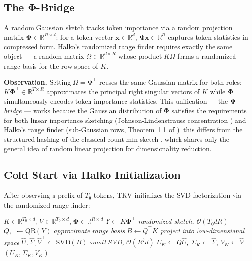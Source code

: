 \documentclass{article}
\newcommand{\R}{\mathbb{R}}
\let\PhiSymbol\Phi
\renewcommand{\Phi}{\boldsymbol{\PhiSymbol}}
\begin{document}
\subsection{The \texorpdfstring{$\Phi$}{Phi}-Bridge}
\label{sec:phi}

A random Gaussian sketch tracks token importance via a random projection
matrix $\Phi \in \R^{R \times d}$: for a token vector $\mathbf{x} \in \R^d$,
$\Phi \mathbf{x} \in \R^R$ captures token statistics in compressed form.
Halko's randomized range finder requires exactly the same object --- a
random matrix $\Omega \in \R^{d \times R}$ whose product $K\Omega$ forms a
randomized range basis for the row space of $K$.

\textbf{Observation.}  Setting $\Omega = \Phi^\top$ reuses the same
Gaussian matrix for both roles: $K\Phi^\top \in \R^{T \times R}$
approximates the principal right singular vectors of $K$ while $\Phi$
simultaneously encodes token importance statistics.  This unification ---
the \emph{$\Phi$-bridge} --- works because the Gaussian distribution of
$\Phi$ satisfies the requirements for both linear importance sketching
(Johnson-Lindenstrauss concentration \citep{johnson1984}) and Halko's range finder
(sub-Gaussian rows, Theorem~1.1 of \citep{halko2011}); this differs from
the structured hashing of the classical count-min sketch
\citep{cormode2005}, which shares only the general idea of random linear
projection for dimensionality reduction.

\subsection{Cold Start via Halko Initialization}
\label{sec:coldstart}

After observing a prefix of $T_0$ tokens, TKV initializes the SVD factorization
via the randomized range finder:

\begin{algorithm}[H]
\caption{Halko Cold Start with $\Phi$-Bridge}
\begin{algorithmic}[1]
\Require $K \in \R^{T_0 \times d}$, $V \in \R^{T_0 \times d}$, $\Phi \in \R^{R \times d}$
\State $Y \leftarrow K \Phi^\top$  \hfill \textit{randomized sketch, $\mathcal{O}(T_0 d R)$}
\State $Q, \_ \leftarrow \mathrm{QR}(Y)$  \hfill \textit{approximate range basis}
\State $B \leftarrow Q^\top K$  \hfill \textit{project into low-dimensional space}
\State $\hat{U}, \hat{\Sigma}, \hat{V}^\top \leftarrow \mathrm{SVD}(B)$  \hfill \textit{small SVD, $\mathcal{O}(R^2 d)$}
\State $U_K \leftarrow Q \hat{U}$, $\Sigma_K \leftarrow \hat{\Sigma}$, $V_K \leftarrow \hat{V}$
\State \Return $(U_K, \Sigma_K, V_K)$
\end{algorithmic}
\end{algorithm}
\end{document}
